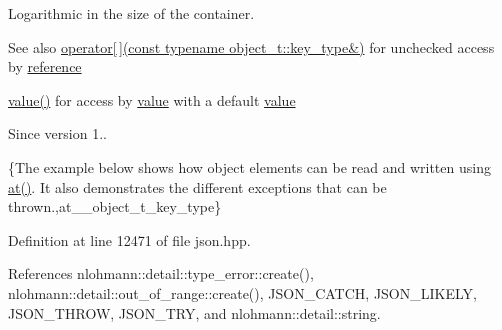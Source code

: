 Logarithmic in the size of the container.

\begin{DoxySeeAlso}{See also}
\hyperlink{classnlohmann_1_1basic__json_a233b02b0839ef798942dd46157cc0fe6}{operator\mbox{[}$\,$\mbox{]}(const typename object\+\_\+t\+::key\+\_\+type\&)} for unchecked access by \hyperlink{classnlohmann_1_1basic__json_ac6a5eddd156c776ac75ff54cfe54a5bc}{reference} 

\hyperlink{classnlohmann_1_1basic__json_adcf8ca5079f5db993820bf50036bf45d}{value()} for access by \hyperlink{classnlohmann_1_1basic__json_adcf8ca5079f5db993820bf50036bf45d}{value} with a default \hyperlink{classnlohmann_1_1basic__json_adcf8ca5079f5db993820bf50036bf45d}{value}
\end{DoxySeeAlso}
\begin{DoxySince}{Since}
version 1..
\end{DoxySince}
\{The example below shows how object elements can be read and written using {\ttfamily \hyperlink{classnlohmann_1_1basic__json_a73ae333487310e3302135189ce8ff5d8}{at()}}. It also demonstrates the different exceptions that can be thrown.,at\+\_\+\+\_\+object\+\_\+t\+\_\+key\+\_\+type\} 

Definition at line 12471 of file json.\+hpp.



References nlohmann\+::detail\+::type\+\_\+error\+::create(), nlohmann\+::detail\+::out\+\_\+of\+\_\+range\+::create(), J\+S\+O\+N\+\_\+\+C\+A\+T\+CH, J\+S\+O\+N\+\_\+\+L\+I\+K\+E\+LY, J\+S\+O\+N\+\_\+\+T\+H\+R\+OW, J\+S\+O\+N\+\_\+\+T\+RY, and nlohmann\+::detail\+::string.



